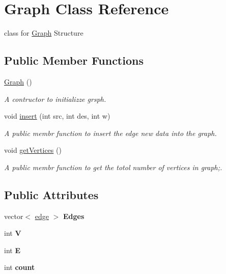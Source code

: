 \hypertarget{classGraph}{}\section{Graph Class Reference}
\label{classGraph}


class for \hyperlink{classGraph}{Graph} Structure  


\subsection*{Public Member Functions}
\begin{DoxyCompactItemize}
\item 
\mbox{\label{classGraph_ae4c72b8ac4d693c49800a4c7e273654f}} 
\hyperlink{classGraph_ae4c72b8ac4d693c49800a4c7e273654f}{Graph} ()
\begin{DoxyCompactList}\small\item\em A contructor to initializze grsph. \end{DoxyCompactList}\item 
void \hyperlink{classGraph_ab98f5baa548d83eeb114a9f08d54425e}{insert} (int src, int des, int w)
\begin{DoxyCompactList}\small\item\em A public membr function to insert the edge new data into the graph. \end{DoxyCompactList}\item 
\mbox{\label{classGraph_a2e7bc124e515f16a1277acad3de1a09b}} 
void \hyperlink{classGraph_a2e7bc124e515f16a1277acad3de1a09b}{get\+Vertices} ()
\begin{DoxyCompactList}\small\item\em A public membr function to get the totol number of vertices in graph;. \end{DoxyCompactList}\end{DoxyCompactItemize}
\subsection*{Public Attributes}
\begin{DoxyCompactItemize}
\item 
\mbox{\label{classGraph_a509ac312e8d33bd9bed23b336d9855d7}} 
vector$<$ \hyperlink{structedge}{edge} $>$ {\bfseries Edges}
\item 
\mbox{\label{classGraph_a2b722f7cfa7a21e4cb5fae488b3d4dcc}} 
int {\bfseries V}
\item 
\mbox{\label{classGraph_a3ce250f958f7e96ffd9eb06780c21fbe}} 
int {\bfseries E}
\item 
\mbox{\label{classGraph_a911f33cb17f59eeaf85f7c5de3034e4f}} 
int {\bfseries count}
\end{DoxyCompactItemize}


